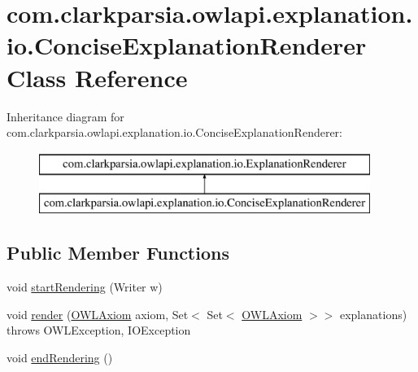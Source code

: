 \hypertarget{classcom_1_1clarkparsia_1_1owlapi_1_1explanation_1_1io_1_1_concise_explanation_renderer}{\section{com.\-clarkparsia.\-owlapi.\-explanation.\-io.\-Concise\-Explanation\-Renderer Class Reference}
\label{classcom_1_1clarkparsia_1_1owlapi_1_1explanation_1_1io_1_1_concise_explanation_renderer}
}
Inheritance diagram for com.\-clarkparsia.\-owlapi.\-explanation.\-io.\-Concise\-Explanation\-Renderer\-:\begin{figure}[H]
\begin{center}
\leavevmode
\includegraphics[height=2.000000cm]{classcom_1_1clarkparsia_1_1owlapi_1_1explanation_1_1io_1_1_concise_explanation_renderer}
\end{center}
\end{figure}
\subsection*{Public Member Functions}
\begin{DoxyCompactItemize}
\item 
void \hyperlink{classcom_1_1clarkparsia_1_1owlapi_1_1explanation_1_1io_1_1_concise_explanation_renderer_a174fed6e29c64c7a7505d1443e4e109b}{start\-Rendering} (Writer w)
\item 
void \hyperlink{classcom_1_1clarkparsia_1_1owlapi_1_1explanation_1_1io_1_1_concise_explanation_renderer_af7dcac32e349b404f13647c6c22c663c}{render} (\hyperlink{interfaceorg_1_1semanticweb_1_1owlapi_1_1model_1_1_o_w_l_axiom}{O\-W\-L\-Axiom} axiom, Set$<$ Set$<$ \hyperlink{interfaceorg_1_1semanticweb_1_1owlapi_1_1model_1_1_o_w_l_axiom}{O\-W\-L\-Axiom} $>$$>$ explanations)  throws O\-W\-L\-Exception, I\-O\-Exception 
\item 
void \hyperlink{classcom_1_1clarkparsia_1_1owlapi_1_1explanation_1_1io_1_1_concise_explanation_renderer_a961041dcbd6e1dafaf02084a48777373}{end\-Rendering} ()
\end{DoxyCompactItemize}
